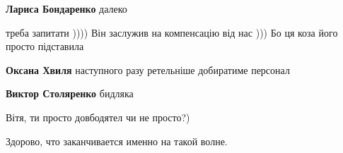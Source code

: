\begin{itemize}
\begin{itemize}
 
\textbf{Лариса Бондаренко} далеко

 
треба запитати )))) Він заслужив на компенсацію від нас ))) Бо ця коза його просто підставила

 
\textbf{Оксана Хвиля} наступного разу ретельніше добиратиме персонал

 
\textbf{Виктор Столяренко} бидляка

 
Вітя, ти просто довбодятел чи не просто?)
\end{itemize}

 
Здорово, что заканчивается именно на такой волне.

\begin{itemize}
 

\end{itemize}
\end{itemize}
